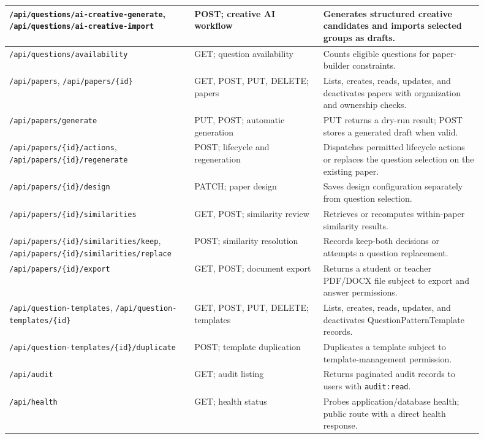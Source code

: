 \begin{table}[H]
\begin{tabular}{|p{0.34\linewidth}|p{0.25\linewidth}|p{0.31\linewidth}|}
        \hline
        \texttt{/api/questions/ai-creative-generate}, \texttt{/api/questions/ai-creative-import} & POST; creative AI workflow & Generates structured creative candidates and imports selected groups as drafts. \\
        \hline
        \texttt{/api/questions/availability} & GET; question availability & Counts eligible questions for paper-builder constraints. \\
        \hline
        \texttt{/api/papers}, \texttt{/api/papers/\{id\}} & GET, POST, PUT, DELETE; papers & Lists, creates, reads, updates, and deactivates papers with organization and ownership checks. \\
        \hline
        \texttt{/api/papers/generate} & PUT, POST; automatic generation & PUT returns a dry-run result; POST stores a generated draft when valid. \\
        \hline
        \texttt{/api/papers/\{id\}/actions}, \texttt{/api/papers/\{id\}/regenerate} & POST; lifecycle and regeneration & Dispatches permitted lifecycle actions or replaces the question selection on the existing paper. \\
        \hline
        \texttt{/api/papers/\{id\}/design} & PATCH; paper design & Saves design configuration separately from question selection. \\
        \hline
        \texttt{/api/papers/\{id\}/similarities} & GET, POST; similarity review & Retrieves or recomputes within-paper similarity results. \\
        \hline
        \texttt{/api/papers/\{id\}/similarities/keep}, \texttt{/api/papers/\{id\}/similarities/replace} & POST; similarity resolution & Records keep-both decisions or attempts a question replacement. \\
        \hline
        \texttt{/api/papers/\{id\}/export} & GET, POST; document export & Returns a student or teacher PDF/DOCX file subject to export and answer permissions. \\
        \hline
        \texttt{/api/question-templates}, \texttt{/api/question-templates/\{id\}} & GET, POST, PUT, DELETE; templates & Lists, creates, reads, updates, and deactivates QuestionPatternTemplate records. \\
        \hline
        \texttt{/api/question-templates/\{id\}/duplicate} & POST; template duplication & Duplicates a template subject to template-management permission. \\
        \hline
        \texttt{/api/audit} & GET; audit listing & Returns paginated audit records to users with \texttt{audit:read}. \\
        \hline
        \texttt{/api/health} & GET; health status & Probes application/database health; public route with a direct health response. \\
        \hline
    \end{tabular}
\end{table}

